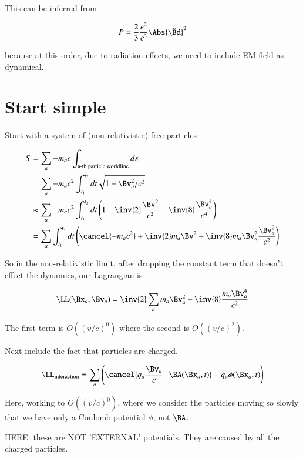 This can be inferred from 

\begin{equation}\label{eqn:relativisticElectrodynamicsL24:70}
P = \frac{2}{3} \frac{e^2}{c^3} \Abs{\ddot{\Bd}}^2
\end{equation}

because at this order, due to radiation effects, we need to include EM field as dynamical.

\section{Start simple}

Start with a system of (non-relativistic) free particles

\begin{align*}
S 
&= \sum_a - m_a c \int_{\text{a-th particle worldline}} ds  \\
&= \sum_a -m_a c^2 \int_{t_1}^{t_2} dt \sqrt{ 1 - \Bv_a^2/c^2} \\
&\approx \sum_a -m_a c^2 \int_{t_1}^{t_2} dt \left( 1 - \inv{2} \frac{\Bv^2}{c^2} - \inv{8} \frac{\Bv_a^4}{c^4}
\right) \\
&= \sum_a \int_{t_1}^{t_2} dt \left( \cancel{-m_a c^2} + \inv{2} m_a \Bv^2 + \inv{8} m_a \Bv_a^2 \frac{\Bv_a^2}{c^2} \right) \\
\end{align*}

So in the non-relativistic limit, after dropping the constant term that doesn't effect the dynamics, our Lagrangian is 

\begin{equation}\label{eqn:relativisticElectrodynamicsL24:90}
\LL(\Bx_a, \Bv_a) = \inv{2} \sum_a m_a \Bv_a^2 + \inv{8} \frac{m_a \Bv_a^4}{c^2}
\end{equation}

The first term is $O((v/c)^0)$ where the second is $O((v/c)^2)$.

Next include the fact that particles are charged.

\begin{equation}\label{eqn:relativisticElectrodynamicsL24:110}
\LL_{\text{interaction}} = \sum_a \left( \cancel{q_a \frac{\Bv_a}{c} \cdot \BA(\Bx_a, t)} - q_a \phi(\Bx_a, t) \right)
\end{equation}

Here, working to $O((v/c)^0)$, where we consider the particles moving so slowly that we have only a Coulomb potential $\phi$, not $\BA$.

HERE: these are NOT 'EXTERNAL' potentials.  They are caused by all the charged particles.

